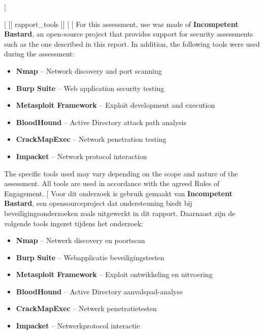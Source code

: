 {{{{%
[%

[%
[[ rapport_tools ]]
[%
[%
For this assessment, use was made of \textbf{Incompetent Bastard}, an open-source project
that provides support for security assessments such as the one described in this report.
In addition, the following tools were used during the assessment:

\begin{itemize}
  \item \textbf{Nmap} -- Network discovery and port scanning
  \item \textbf{Burp Suite} -- Web application security testing
  \item \textbf{Metasploit Framework} -- Exploit development and execution
  \item \textbf{BloodHound} -- Active Directory attack path analysis
  \item \textbf{CrackMapExec} -- Network penetration testing
  \item \textbf{Impacket} -- Network protocol interaction
\end{itemize}

The specific tools used may vary depending on the scope and nature of the assessment.
All tools are used in accordance with the agreed Rules of Engagement.
[%
Voor dit onderzoek is gebruik gemaakt van \textbf{Incompetent Bastard}, een opensourceproject
dat ondersteuning biedt bij beveiligingsonderzoeken zoals uitgewerkt in dit rapport.
Daarnaast zijn de volgende tools ingezet tijdens het onderzoek:

\begin{itemize}
  \item \textbf{Nmap} -- Netwerk discovery en poortscan
  \item \textbf{Burp Suite} -- Webapplicatie beveiligingstesten
  \item \textbf{Metasploit Framework} -- Exploit ontwikkeling en uitvoering
  \item \textbf{BloodHound} -- Active Directory aanvalspad-analyse
  \item \textbf{CrackMapExec} -- Netwerk penetratietesten
  \item \textbf{Impacket} -- Netwerkprotocol interactie
\end{itemize}

}}}}

